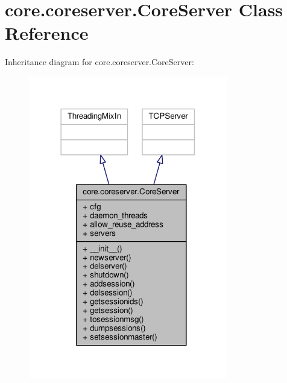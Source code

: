 \hypertarget{classcore_1_1coreserver_1_1_core_server}{\section{core.\+coreserver.\+Core\+Server Class Reference}
\label{classcore_1_1coreserver_1_1_core_server}
}


Inheritance diagram for core.\+coreserver.\+Core\+Server\+:
\nopagebreak
\begin{figure}[H]
\begin{center}
\leavevmode
\includegraphics[width=246pt]{classcore_1_1coreserver_1_1_core_server__inherit__graph}
\end{center}
\end{figure}


